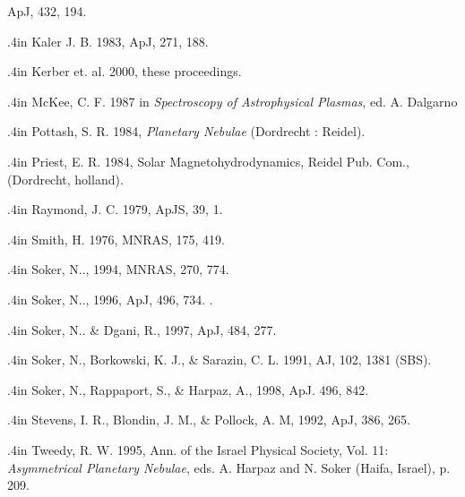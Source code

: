 \begin{references}
ApJ, 432, 194.
\par {} \noindent \hangindent .4in  Kaler J. B. 1983, ApJ, 271, 188.
\par {} \noindent \hangindent .4in  Kerber et. al. 2000, these proceedings.
\par {} \noindent \hangindent .4in  McKee, C. F. 1987 in {\it Spectroscopy of Astrophysical
 Plasmas}, ed. A. Dalgarno
\par {} \noindent \hangindent .4in  Pottash, S. R. 1984, {\it Planetary Nebulae} (Dordrecht : Reidel).
\par {} \noindent \hangindent .4in  Priest, E. R. 1984, Solar Magnetohydrodynamics,
Reidel Pub. Com., (Dordrecht, holland).
\par {} \noindent \hangindent .4in  Raymond, J. C. 1979, ApJS, 39, 1.
\par {} \noindent \hangindent .4in  Smith, H. 1976, MNRAS, 175, 419.
\par {} \noindent \hangindent .4in  Soker, N.., 1994, MNRAS, 270, 774.
\par {} \noindent \hangindent .4in  Soker, N.., 1996, ApJ, 496, 734. .
\par {} \noindent \hangindent .4in  Soker, N.. \& Dgani, R., 1997, ApJ, 484, 277.
\par {} \noindent \hangindent .4in  Soker, N., Borkowski, K. J., \& Sarazin, C. L. 1991, AJ, 102, 1381 (SBS).
\par {} \noindent \hangindent .4in  Soker, N., Rappaport, S., \& Harpaz, A., 1998, ApJ. 496, 842.
\par {} \noindent \hangindent .4in  Stevens, I. R., Blondin, J. M., \& Pollock, A. M, 1992, ApJ, 386, 265.
\par {} \noindent \hangindent .4in  Tweedy, R. W. 1995,
Ann. of the Israel Physical Society, Vol. 11:
{\it Asymmetrical Planetary Nebulae},
eds. A. Harpaz and N. Soker (Haifa, Israel), p. 209.

\end{references}
